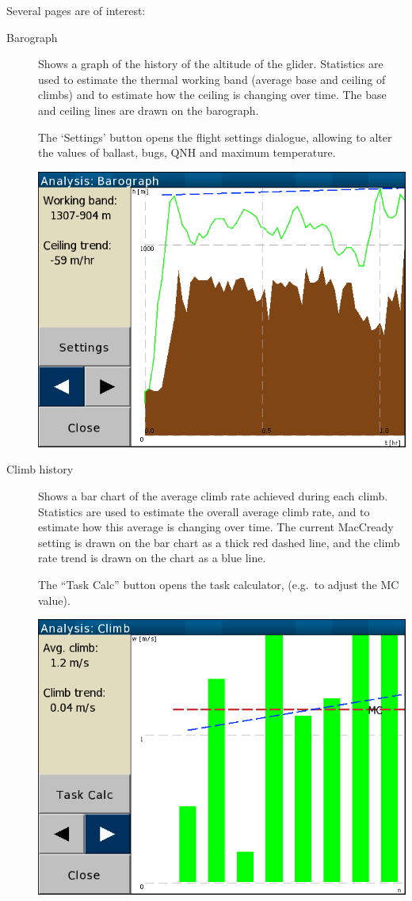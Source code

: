 Several pages are of interest:
\begin{description}
\item[Barograph]  Shows a graph of the history of the altitude of the glider.
  Statistics are used to estimate the thermal working band (average
  base and ceiling of climbs) and to estimate how the ceiling is
  changing over time.  The base and ceiling lines are drawn on the
  barograph.

  The `Settings' button opens the flight settings dialogue,
  allowing to alter the values of ballast, bugs, QNH and maximum temperature.

\begin{center}
\includegraphics[angle=0,width=0.8\linewidth,keepaspectratio='true']{figures/analysis-barograph.png}
\end{center}

\item[Climb history]
  Shows a bar chart of the average climb rate achieved during each
  climb.  Statistics are used to estimate the overall average climb
  rate, and to estimate how this average is changing over time.  The
  current MacCready setting is drawn on the bar chart as a thick red
  dashed line, and the climb rate trend is drawn on the chart as a
  blue line.

  The ``Task Calc'' button opens the task calculator,
  (e.g.\ to adjust the MC value).

\begin{center}
\includegraphics[angle=0,width=0.8\linewidth,keepaspectratio='true']{figures/analysis-climb.png}
\end{center}


\end{description}
